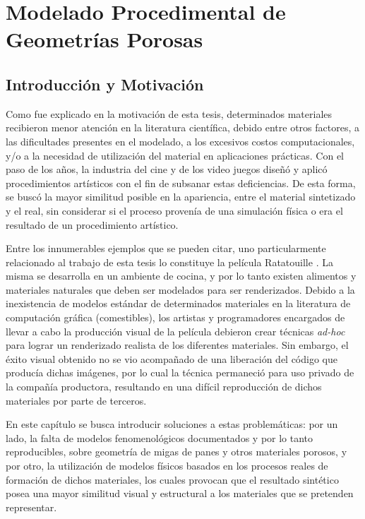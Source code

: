 \chapter[Modelado Procedimental de Geometrías Porosas]{Modelado Procedimental de Geometrías Porosas}

\section{Introducción y Motivación} %
Como fue explicado en la motivación de esta tesis, determinados materiales recibieron menor atención en la literatura científica, debido entre otros factores, a las dificultades presentes	 en el modelado, a los excesivos costos computacionales, y/o a la necesidad de utilización del material en aplicaciones prácticas.
Con el paso de los a\~nos, la industria del cine y de los video juegos diseñó y aplicó procedimientos artísticos con el fin de subsanar estas deficiencias.
De esta forma, se busc\'o la mayor similitud posible en la apariencia, entre el material sintetizado y el real, sin considerar si el proceso provenía de una simulación física o era el resultado de un procedimiento artístico.

Entre los innumerables ejemplos que se pueden citar, uno particularmente relacionado al trabajo de esta tesis lo constituye la película Ratatouille \cite{Cho2007}.
La misma se desarrolla en un ambiente de cocina, y por lo tanto existen alimentos y materiales naturales que deben ser modelados para ser renderizados.
Debido a la inexistencia de modelos estándar de determinados materiales en la literatura de computación gráfica (comestibles), los artistas y programadores encargados de llevar a cabo la producción visual de la película debieron crear técnicas {\em ad-hoc} para lograr un renderizado realista de los diferentes materiales.
Sin embargo, el éxito visual obtenido no se vio acompañado de una liberación del código que producía dichas imágenes, por lo cual la técnica permaneció para uso privado de la compañía productora, resultando en una difícil reproducción de dichos materiales por parte de terceros.

En este capítulo se busca introducir soluciones a estas problemáticas: por un lado, la falta de modelos fenomenológicos documentados y por lo tanto reproducibles, sobre geometría de migas de panes y otros materiales porosos, y por otro, la utilización de modelos físicos basados en los procesos reales de formación de dichos materiales, los cuales provocan que el resultado sintético posea una mayor similitud visual y estructural a los materiales que se pretenden representar.

